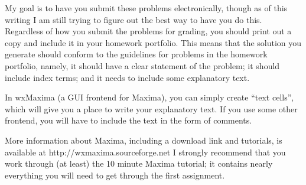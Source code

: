 \documentclass{article}
\begin{document}
My goal is to have you submit these problems electronically, though as
of this writing I am still trying to figure out the best way to have
you do this. Regardless of how you submit the problems for grading,
you should print out a copy and include it in your homework portfolio.
This means that the solution you generate should conform to the
guidelines for problems in the homework portfolio, namely, it should
have a clear statement of the problem; it should include index terms;
and it needs to include some explanatory text.

In wxMaxima (a GUI frontend for Maxima), you can simply create ``text
cells'', which will give you a place to write your explanatory text.
If you use some other frontend, you will have to include the text in
the form of comments.

More information about Maxima, including a download link and
tutorials, is available at \newline
http://wxmaxima.sourceforge.net \newline  I
strongly recommend that you work through (at least) the 10 minute
Maxima tutorial; it contains nearly everything you will need to get
through the first assignment.
\end{document}
